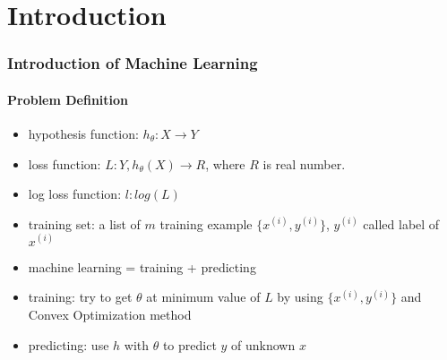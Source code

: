 
\ifx\allfiles\undefined

\fi
\section{Introduction}
\begin{frame}
\frametitle{Introduction of Machine Learning}
\framesubtitle{Problem Definition}
	\small
	\begin{itemize}
		\item hypothesis function: $h_{\theta}:X \rightarrow Y$
		\item loss function: $L:Y,h_{\theta}(X) \rightarrow R$, where $R$ is real number.
		\item log loss function: $l:log(L)$ 
		\item training set: a list of $m$ training example $\{x^{(i)},y^{(i)}\}$, $y^{(i)}$ called label of $x^{(i)}$
		\item machine learning = training + predicting
		\item training: try to get $\theta$ at minimum value of $L$ by using $\{x^{(i)},y^{(i)}\}$ and Convex Optimization method
		\item predicting: use $h$ with $\theta$ to predict $y$ of unknown $x$
	\end{itemize}
\end{frame}

